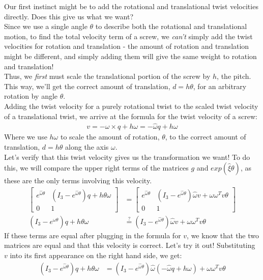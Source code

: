 \documentclass[oneside]{book}
\begin{document}
Our first instinct might be to add the rotational and translational twist velocities directly. Does this give us what we want?\\
Since we use a single angle $\theta$ to describe both the rotational and translational motion, to find the total velocity term of a screw, we \textit{can't} simply add the twist velocities for rotation and translation - the amount of rotation and translation might be different, and simply adding them will give the same weight to rotation and translation! \\
Thus, we \textit{first} must scale the translational portion of the screw by $h$, the pitch. This way, we'll get the correct amount of translation, $d = h\theta$, for an arbitrary rotation by angle $\theta$.\\
Adding the twist velocity for a purely rotational twist to the scaled twist velocity of a translational twist, we arrive at the formula for the twist velocity of a screw:
\begin{align}
    v = -\omega \times q + h\omega = -\hat\omega q + h\omega
\end{align}
Where we use $h\omega$ to scale the amount of rotation, $\theta$, to the correct amount of translation, $d = h\theta$ along the axis $\omega$.\\
Let's verify that this twist velocity gives us the transformation we want! To do this, we will compare the upper right terms of the matrices $g$ and $exp(\hat\xi\theta)$, as these are the only terms involving this velocity.
\begin{align}
    \begin{bmatrix}
    e^{\hat\omega\theta} & (I_3 -e^{\hat\omega\theta})q + h\theta\omega \\
    0 & 1
    \end{bmatrix} &= \begin{bmatrix}
    e^{\hat\omega\theta} & (I_3 - e^{\hat\omega\theta})\hat\omega v + \omega \omega ^T v\theta\\
    0 & 1
    \end{bmatrix}\\
    (I_3 -e^{\hat\omega\theta})q + h\theta\omega
    &\stackrel{?}{=} 
    (I_3 - e^{\hat\omega\theta})\hat\omega v + \omega \omega ^T v \theta
\end{align}
If these terms are equal after plugging in the formula for $v$, we know that the two matrices are equal and that this velocity is correct. Let's try it out!
Substituting $v$ into its first appearance on the right hand side, we get:
\begin{align}
     (I_3 -e^{\hat\omega\theta})q + h\theta\omega &= (I_3 - e^{\hat\omega\theta})\hat\omega(-\hat\omega q + h\omega) + \omega \omega ^T v\theta
\end{align}
\end{document}
